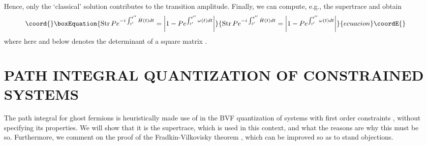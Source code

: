 \documentclass[a4paper,10pt]{article}
\begin{document}
Hence, only the `classical' solution contributes to the transition amplitude. Finally, we 
can compute, e.g., the supertrace and obtain 
\begin{equation}\coord{}\boxEquation{
\mathrm{Str}\,P e^{-i\int_{t^{\prime}}^{t^{\prime\prime}}\hat{H}(t)dt}=\left|1-
Pe^{\int_{t^{\prime}}^{t^{\prime\prime}}\omega(t)dt}\right|
}{
\mathrm{Str}\,P e^{-i\int_{t^{\prime}}^{t^{\prime\prime}}\hat{H}(t)dt}=\left|1-
Pe^{\int_{t^{\prime}}^{t^{\prime\prime}}\omega(t)dt}\right|
}{ecuacion}\coordE{}\end{equation}
where here and below \coordHE{} denotes the determinant of a square matrix \coordHE{}.

\section{PATH INTEGRAL QUANTIZATION OF CONSTRAINED SYSTEMS}

The path integral for ghost fermions is heuristically made use of in the BVF 
quantization of systems with first order constraints \cite{Frad 75,Henn 92}, without 
specifying its properties. We will show that it is the supertrace, which is used in this 
context, and what the reasons are why this must be so. Furthermore, we comment on the 
proof of the 
Fradkin-Vilkovisky theorem \cite{Bata 77}, which can be improved so as to stand 
objections. 
\end{document}
